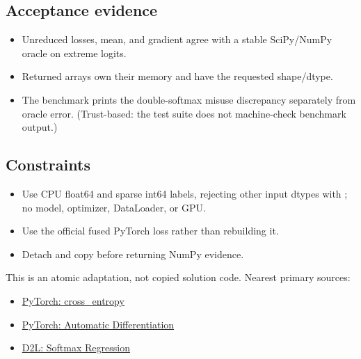         \subsection{Acceptance evidence}

        \begin{evidencebox}
        \begin{itemize}
          \item Unreduced losses, mean, and gradient agree with a stable SciPy/NumPy oracle on extreme logits.
  \item Returned arrays own their memory and have the requested shape/dtype.
  \item The benchmark prints the double-softmax misuse discrepancy separately from oracle error. (Trust-based: the test suite does not machine-check benchmark output.)
        \end{itemize}
        \end{evidencebox}

        \subsection{Constraints}

        \begin{itemize}
          \item Use CPU float64 and sparse int64 labels, rejecting other input dtypes with ; no model, optimizer, DataLoader, or GPU.
  \item Use the official fused PyTorch loss rather than rebuilding it.
  \item Detach and copy before returning NumPy evidence.
        \end{itemize}

        \begin{sourcebox}
        This is an atomic adaptation, not copied solution code. Nearest primary sources:
        \begin{itemize}
          \item \href{https://docs.pytorch.org/docs/stable/generated/torch.nn.functional.cross_entropy.html}{PyTorch: cross\_entropy}
  \item \href{https://docs.pytorch.org/tutorials/beginner/basics/autogradqs_tutorial.html}{PyTorch: Automatic Differentiation}
  \item \href{https://d2l.ai/chapter_linear-classification/softmax-regression.html}{D2L: Softmax Regression}
        \end{itemize}
        \end{sourcebox}
